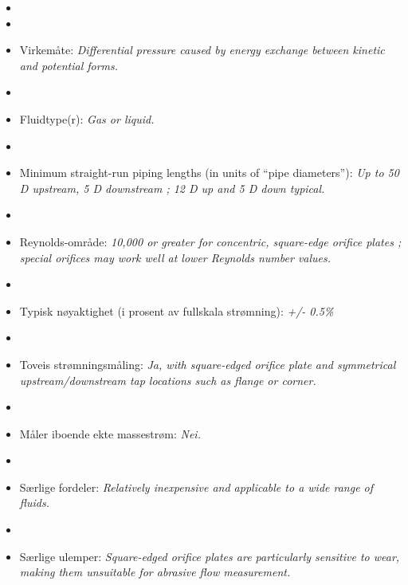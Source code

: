 \begin{itemize}
\goodbreak
\item{} 
\vskip 5pt
\item\item{} Virkemåte: {\it Differential pressure caused by energy exchange between kinetic and potential forms.}
\vskip 5pt
\item\item{} Fluidtype(r): {\it Gas or liquid.}
\vskip 5pt
\item\item{} Minimum straight-run piping lengths (in units of ``pipe diameters''): {\it Up to 50 D upstream, 5 D downstream ; 12 D up and 5 D down typical.}
\vskip 5pt
\item\item{} Reynolds-område: {\it 10,000 or greater for concentric, square-edge orifice plates ; special orifices may work well at lower Reynolds number values.}
\vskip 5pt
\item\item{} Typisk nøyaktighet (i prosent av fullskala strømning): {\it +/- 0.5\%}
\vskip 5pt
\item\item{} Toveis strømningsmåling: {\it Ja, with square-edged orifice plate and symmetrical upstream/downstream tap locations such as flange or corner.}
\vskip 5pt
\item\item{} Måler iboende ekte massestrøm: {\it Nei.}
\vskip 5pt
\item\item{} Særlige fordeler: {\it Relatively inexpensive and applicable to a wide range of fluids.}
\vskip 5pt
\item\item{} Særlige ulemper: {\it Square-edged orifice plates are particularly sensitive to wear, making them unsuitable for abrasive flow measurement.}
\end{itemize}


